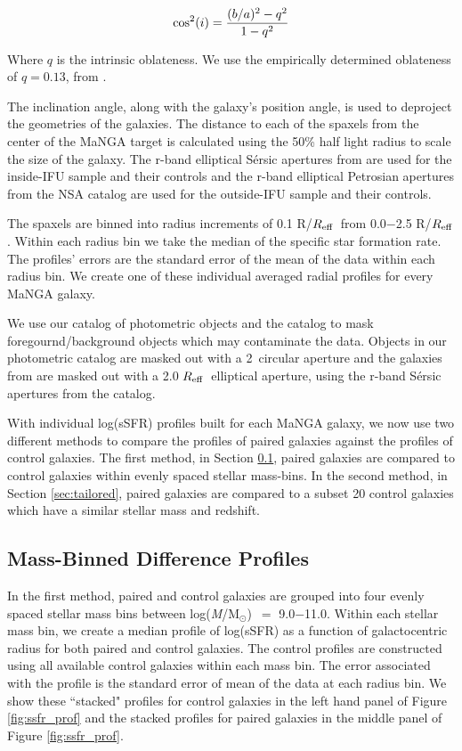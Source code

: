 \documentclass[iop,revtex4,twocolumn,apj,numberedappendix,appendixfloats]{emulateapj}
\newcommand{\reff}{$R_{\rm eff}$}
\newcommand{\logm}{log({\it M}/M$_{\odot}$)}
\begin{document}
\begin{equation}
{\rm cos^2}(i) = \frac{(b/a)^2 - q^2}{1 - q^2}
\end{equation}

Where $q$ is the intrinsic oblateness. We use the empirically determined oblateness of $q = 0.13$, from \citet{Giovanelli:1994}.

The inclination angle, along with the galaxy's position angle, is used to deproject the geometries of the galaxies. The distance to each of the spaxels from the center of the MaNGA target is calculated using the 50\% half light radius to scale the size of the galaxy. The r-band elliptical S\'ersic apertures from \citet{Simard:2011} are used for the inside-IFU sample and their controls and the r-band elliptical Petrosian apertures from the NSA catalog are used for the outside-IFU sample and their controls. 

The spaxels are binned into radius increments of 0.1 R/\reff\ from 0.0$-$2.5 R/\reff. Within each radius bin we take the median of the specific star formation rate. The profiles' errors are the standard error of the mean of the data within each radius bin. We create one of these individual averaged radial profiles for every MaNGA galaxy. 

We use our catalog of photometric objects and the \citet{Simard:2011} catalog to mask foregournd/background objects which may contaminate the data. Objects in our photometric catalog are masked out with a 2\arcsec\ circular aperture and the galaxies from \citet{Simard:2011} are masked out with a 2.0 \reff\ elliptical aperture, using the r-band S\'ersic apertures from the catalog. 

With individual log(sSFR) profiles built for each MaNGA galaxy, we now use two different methods to compare the profiles of paired galaxies against the profiles of control galaxies. The first method, in Section \ref{sec:mass-bin}, paired galaxies are compared to control galaxies within evenly spaced stellar mass-bins. In the second method, in Section \ref{sec:tailored}, paired galaxies are compared to a subset 20 control galaxies which have a similar stellar mass and redshift. 

\subsection{Mass-Binned Difference Profiles}\label{sec:mass-bin}

In the first method, paired and control galaxies are grouped into four evenly spaced stellar mass bins between \logm\ $=$ 9.0$-$11.0. Within each stellar mass bin, we create a median profile of log(sSFR) as a function of galactocentric radius for both paired and control galaxies. The control profiles are constructed using all available control galaxies within each mass bin. The error associated with the profile is the standard error of mean of the data at each radius bin. We show these ``stacked" profiles for control galaxies in the left hand panel of Figure \ref{fig:ssfr_prof} and the stacked profiles for paired galaxies in the middle panel of Figure \ref{fig:ssfr_prof}.
\end{document}
